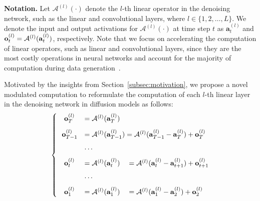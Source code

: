 \textbf{Notation.} 
Let \(\mathcal{A}^{(l)}(\cdot)\) denote the \(l\)-th linear operator in the denoising network, such as the linear and convolutional layers, where $l\in\{1,2,\ldots,L\}$. We denote the input and output activations for \(\mathcal{A}^{(l)}(\cdot)\) at time step \(t\) as \(\mathbf{a}_t^{(l)}\) and ${\mathbf{o}}_t^{(l)}={\mathcal{A}}^{(l)}({\mathbf{a}}_t^{(l)})$, respectively. Note that we focus on accelerating the computation of linear operators, such as linear and convolutional layers, since they are the most costly operations in neural networks and account for the majority of computation during data generation~\citep{zhao2024mixdq}. 

Motivated by the insights from Section~\ref{subsec:motivation}, we propose a novel modulated computation to reformulate the computation of each $l$-th linear layer in the denoising network in diffusion models as follows:
{
\small
\begin{align}
\label{eqn:reformulate}
\begin{cases}
    ~~~{\mathbf{o}}_{T}^{(l)} &=  {\mathcal{A}}^{(l)}({\mathbf{a}}_T^{(l)})  \\[8pt]
    ~~{\mathbf{o}}_{T-1}^{(l)} &=  {\mathcal{A}}^{(l)}({\mathbf{a}}_{T-1}^{(l)}) = {\mathcal{A}}^{(l)}({\mathbf{a}}_{T-1}^{(l)}-{\mathbf{a}}_{T}^{(l)})+{\mathbf{o}}_{T}^{(l)} \\[6pt]
    & \cdots \\[6pt]
    ~~~{\mathbf{o}}_t^{(l)}  &=  {\mathcal{A}}^{(l)}({\mathbf{a}}_{t}^{(l)}) ~~~= {\mathcal{A}}^{(l)}({\mathbf{a}}_t^{(l)}-{\mathbf{a}}_{t+1}^{(l)})+{\mathbf{o}}_{t+1}^{(l)} \\[6pt]
    & \cdots \\[6pt]
    ~~~{\mathbf{o}}_1^{(l)}  &=  {\mathcal{A}}^{(l)}({\mathbf{a}}_{1}^{(l)}) ~~~= {\mathcal{A}}^{(l)}({\mathbf{a}}_1^{(l)}-{\mathbf{a}}_{2}^{(l)})+{\mathbf{o}}_{2}^{(l)}
\end{cases}
\end{align}
}

